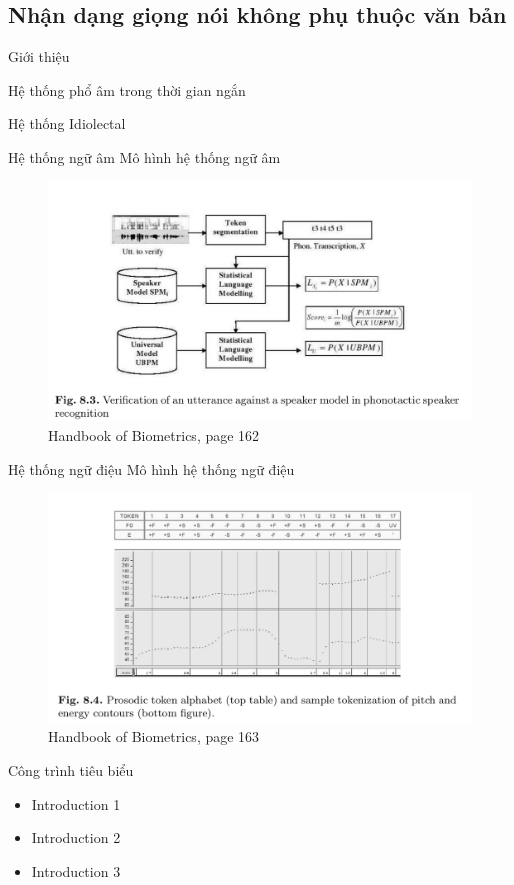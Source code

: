\documentclass[notheorems, aspectratio=54]{beamer}
\begin{document}
\subsection{Nhận dạng giọng nói không phụ thuộc văn bản}
\begin{frame}{Giới thiệu}
	
\end{frame}
\begin{frame}{Hệ thống phổ âm trong thời gian ngắn}
	
\end{frame}
\begin{frame}{Hệ thống Idiolectal}

\end{frame}
\begin{frame}{Hệ thống ngữ âm}
	Mô hình hệ thống ngữ âm
	\begin{figure}[H]
		\includegraphics[width=0.9\linewidth]{images/figure_8_3.png}
		\caption{Handbook of Biometrics, page 162}
		\label{fig:writing-thesis}
	\end{figure}
\end{frame}	
\begin{frame}{Hệ thống ngữ điệu}
	Mô hình hệ thống ngữ điệu
	\begin{figure}
		\includegraphics[width=0.9\linewidth]{images/figure_8_4.png}
		\caption{Handbook of Biometrics, page 163}
		\label{fig:writing-thesis}
	\end{figure}
\end{frame}	
\begin{frame}{Công trình tiêu biểu}
	\begin{itemize}
		\item Introduction 1
		\item Introduction 2
		\item Introduction 3
	\end{itemize}
\end{frame}
\end{document}
